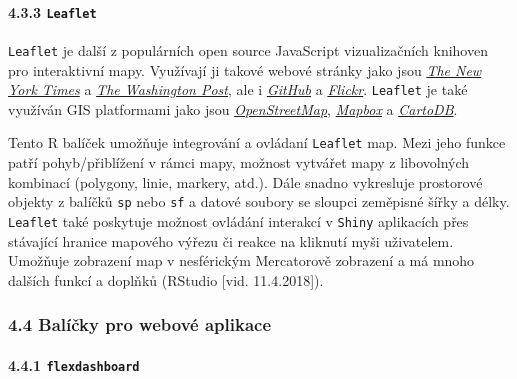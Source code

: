 \documentclass[12pt,]{article}
\let\oldparagraph\paragraph
\renewcommand{\paragraph}[1]{\oldparagraph{#1}\mbox{}}
\begin{document}
\vspace*{-0.4cm}

\hypertarget{leaflet}{\paragraph{\texorpdfstring{4.3.3
\texttt{Leaflet}}{4.3.3 Leaflet}}\label{leaflet}}

\qquad \texttt{Leaflet} je další z populárních open source JavaScript
vizualizačních knihoven pro interaktivní mapy. Využívají ji takové
webové stránky jako jsou
\href{http://www.nytimes.com/projects/elections/2013/nyc-primary/mayor/map.html}{\emph{The
New York Times}} a
\href{http://www.washingtonpost.com/sf/local/2013/11/09/washington-a-world-apart/?utm_term=.906188040dc1}{\emph{The
Washington Post}}, ale i
\href{https://blog.github.com/2013-06-13-there-s-a-map-for-that/}{\emph{GitHub}}
a \href{https://www.flickr.com/map}{\emph{Flickr}}. \texttt{Leaflet} je
také využíván GIS platformami jako jsou
\href{http://www.openstreetmap.org/\#map=7/49.714/15.060}{\emph{OpenStreetMap}},
\href{https://www.mapbox.com/}{\emph{Mapbox}} a
\href{https://carto.com/}{\emph{CartoDB}}.

\qquad Tento R balíček umožňuje integrování a ovládaní \texttt{Leaflet}
map. Mezi jeho funkce patří pohyb/přiblížení v rámci mapy, možnost
vytvářet mapy z libovolných kombinací (polygony, linie, markery, atd.).
Dále snadno vykresluje prostorové objekty z balíčků \texttt{sp} nebo
\texttt{sf} a datové soubory se sloupci zeměpisné šířky a délky.
\texttt{Leaflet} také poskytuje možnost ovládání interakcí v
\texttt{Shiny} aplikacích přes stávající hranice mapového výřezu či
reakce na kliknutí myši uživatelem. Umožňuje zobrazení map v nesférickým
Mercatorově zobrazení a má mnoho dalších funkcí a doplňků (RStudio
{[}vid. 11.4.2018{]}). \vspace*{-0.2cm}

\hypertarget{webviz}{\subsubsection{4.4 Balíčky pro webové
aplikace}\label{webviz}}

\paragraph{\texorpdfstring{4.4.1
\texttt{flexdashboard}}{4.4.1 flexdashboard}}\label{flexdashboard}
\end{document}
